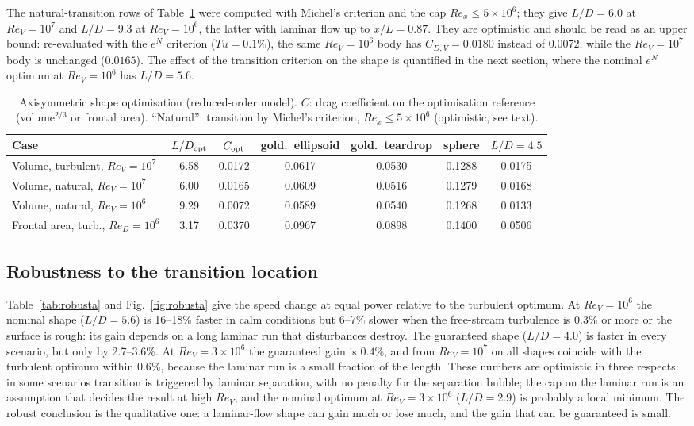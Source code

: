 \documentclass[11pt,a4paper]{article}
\newcommand{\ReV}{\mathit{Re}_V}
\begin{document}
The natural-transition rows of Table~\ref{tab:shape} were computed with Michel's criterion
and the cap $Re_x\le5\times10^6$; they give $L/D=6.0$ at $\ReV=10^7$ and $L/D=9.3$ at
$\ReV=10^6$, the latter with laminar flow up to $x/L=0.87$. They are optimistic and should be read
as an upper bound: re-evaluated with the $e^N$ criterion ($Tu=0.1\%$), the same $\ReV=10^6$ body
has $C_{D,V}=0.0180$ instead of $0.0072$, while the $\ReV=10^7$ body is unchanged ($0.0165$).
The effect of the transition criterion on the shape is quantified in the next section, where
the nominal $e^N$ optimum at $\ReV=10^6$ has $L/D=5.6$.

\begin{table}[h]\centering
\caption{Axisymmetric shape optimisation (reduced-order model). $C$: drag coefficient on the
optimisation reference (volume$^{2/3}$ or frontal area). ``Natural'': transition by Michel's
criterion, $Re_x\le5\times10^6$ (optimistic, see text).}\label{tab:shape}
\small\setlength{\tabcolsep}{4pt}
\begin{tabular}{lcccccc}
\toprule
Case & $L/D_{\rm opt}$ & $C_{\rm opt}$ & gold.\ ellipsoid & gold.\ teardrop & sphere & $L/D=4.5$\\
\midrule
Volume, turbulent, $\ReV=10^7$ & 6.58 & 0.0172 & 0.0617 & 0.0530 & 0.1288 & 0.0175\\
Volume, natural, $\ReV=10^7$ & 6.00 & 0.0165 & 0.0609 & 0.0516 & 0.1279 & 0.0168\\
Volume, natural, $\ReV=10^6$ & 9.29 & 0.0072 & 0.0589 & 0.0540 & 0.1268 & 0.0133\\
Frontal area, turb., $Re_D=10^6$ & 3.17 & 0.0370 & 0.0967 & 0.0898 & 0.1400 & 0.0506\\
\bottomrule
\end{tabular}
\end{table}

\subsection{Robustness to the transition location}
Table~\ref{tab:robusta} and Fig.~\ref{fig:robusta} give the speed change at equal power
relative to the turbulent optimum. At $\ReV=10^6$ the nominal shape ($L/D=5.6$) is 16--18\%
faster in calm conditions but 6--7\% slower when the free-stream turbulence is $0.3\%$ or more
or the surface is rough: its gain depends on a long laminar run that disturbances destroy. The
guaranteed shape ($L/D=4.0$) is faster in every scenario, but only by 2.7--3.6\%. At
$\ReV=3\times10^6$ the guaranteed gain is $0.4\%$, and from $\ReV=10^7$ on all shapes coincide
with the turbulent optimum within $0.6\%$, because the laminar run is a small fraction of the
length. These numbers are optimistic in three respects: in some scenarios transition is
triggered by laminar separation, with no penalty for the separation bubble; the cap on the
laminar run is an assumption that decides the result at high $\ReV$; and the nominal optimum at
$\ReV=3\times10^6$ ($L/D=2.9$) is probably a local minimum. The robust conclusion is the
qualitative one: a laminar-flow shape can gain much or lose much, and the gain that can be
guaranteed is small.
\end{document}
